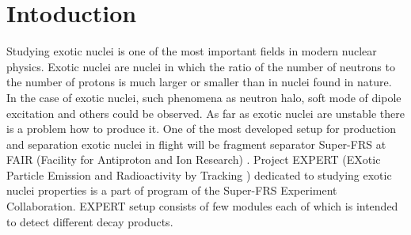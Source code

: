 \documentclass{webofc}
\begin{document}
\section{Intoduction}
Studying exotic nuclei is one of the most important fields in modern nuclear physics. Exotic nuclei are nuclei in which the ratio of the number of neutrons to the number of protons is much larger or smaller than in nuclei found in nature. In the case of exotic nuclei, such phenomena as neutron halo, soft mode of dipole excitation and others could be observed. As far as exotic nuclei are unstable there is a problem how to produce it. One of the most developed setup for production and separation   exotic nuclei in flight will be fragment separator Super-FRS at FAIR (Facility for Antiproton and Ion Research) \cite{diplom}. Project EXPERT (EXotic Particle Emission and Radioactivity by Tracking \cite{IMexpert}) dedicated to studying exotic nuclei properties is a part of program of the Super-FRS Experiment Collaboration. EXPERT setup consists of few modules each of which is intended to detect different decay products. 
\color{black}
\end{document}

